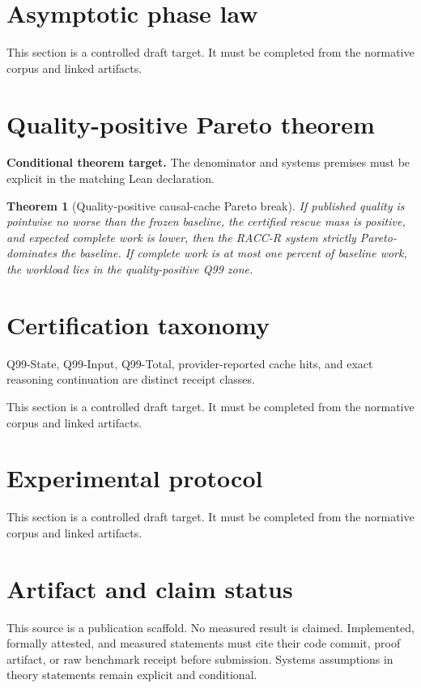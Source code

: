 \documentclass[11pt]{article}
\newtheorem{theorem}{Theorem}
\begin{document}
\section{Asymptotic phase law}
This section is a controlled draft target. It must be completed from the normative corpus and linked artifacts.

\section{Quality-positive Pareto theorem}
\textbf{Conditional theorem target.} The denominator and systems premises must be explicit in the matching Lean declaration.
\begin{theorem}[Quality-positive causal-cache Pareto break]
If published quality is pointwise no worse than the frozen baseline, the certified rescue mass is positive, and expected complete work is lower, then the RACC-R system strictly Pareto-dominates the baseline. If complete work is at most one percent of baseline work, the workload lies in the quality-positive Q99 zone.
\end{theorem}

\section{Certification taxonomy}
Q99-State, Q99-Input, Q99-Total, provider-reported cache hits, and exact reasoning continuation are distinct receipt classes.

This section is a controlled draft target. It must be completed from the normative corpus and linked artifacts.

\section{Experimental protocol}
This section is a controlled draft target. It must be completed from the normative corpus and linked artifacts.

\section*{Artifact and claim status}
This source is a publication scaffold. No measured result is claimed. Implemented,
formally attested, and measured statements must cite their code commit, proof
artifact, or raw benchmark receipt before submission. Systems assumptions in
theory statements remain explicit and conditional.
\end{document}
